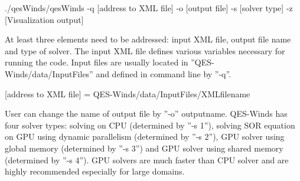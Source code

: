 ./qesWinds/qesWinds -q [address to XML file] -o [output file] -s [solver type] -z [Visualization output]
\newline

\noindent
At least three elements need to be addressed: input XML file, output file name and type of solver.
The input XML file defines various variables necessary for running the code. Input files are usually located in ''QES-Winds/data/InputFiles'' and defined in command line by ''-q''.
\newline

[address to XML file] = QES-Winds/data/InputFiles/XMLfilename
\newline

User can change the name of output file by  ''-o'' outputname.
QES-Winds has four solver types: solving on CPU (determined by ''-s 1''), solving SOR equation on GPU using dynamic parallelism (determined by ''-s 2''), GPU solver using global memory (determined by ''-s 3'') and GPU solver using shared memory (determined by ''-s 4''). GPU solvers are much faster than CPU solver and are highly recommended especially for large domains.


